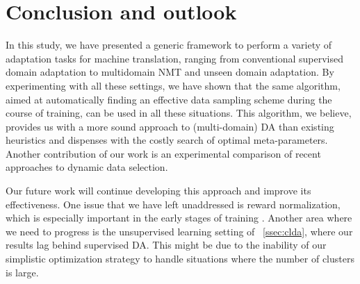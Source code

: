 \documentclass[11pt]{article}
\newcommand{\fyDone}[1]{\done[FY]\Todo[FY:]{\textcolor{orange}{#1}}}
\begin{document}
\section{Conclusion and outlook \label{sec:conclusion}}
\fyDone{Write conclusion}
In this study, we have presented a generic framework to perform a variety of adaptation tasks for machine translation, ranging from conventional supervised domain adaptation to multidomain NMT and unseen domain adaptation. By experimenting with all these settings, we have shown that the same algorithm, aimed at automatically finding an effective data sampling scheme during the course of training, can be used in all these situations. This algorithm, we believe, provides us with a more sound approach to (multi-domain) DA than existing heuristics and dispenses with the costly search of optimal meta-parameters. Another contribution of our work is an experimental comparison of recent approaches to dynamic data selection.

Our future work will continue developing this approach and improve its effectiveness. One issue that we have left unaddressed is reward normalization, which is especially important in the early stages of training \cite{Kumar19reinforcement}. Another area where we need to progress is the unsupervised learning setting of \textsection~\ref{ssec:clda}, where our results lag behind supervised DA. This might be due to the inability of our simplistic optimization strategy to handle situations where the number of clusters is large.



%
\end{document}
